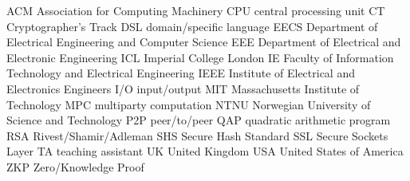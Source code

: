   {ACM}  {Association for Computing Machinery}
  {CPU}  {central processing unit}
   {CT}   {Cryptographer's Track}
  {DSL}  {domain\-/specific language}
 {EECS} {Department of Electrical Engineering and Computer Science}
  {EEE}  {Department of Electrical and Electronic Engineering}
  {ICL}  {Imperial College London}
   {IE}   {Faculty of Information Technology and Electrical Engineering}
 {IEEE} {Institute of Electrical and Electronics Engineers}
   {I/O}  {input/output}
  {MIT}  {Massachusetts Institute of Technology}
  {MPC}  {multiparty computation}
 {NTNU} {Norwegian University of Science and Technology}
  {P2P}  {peer\-/to\-/peer}
  {QAP}  {quadratic arithmetic program}
  {RSA}  {Rivest\-/Shamir\-/Adleman}
  {SHS}  {Secure Hash Standard}
  {SSL}  {Secure Sockets Layer}
   {TA}   {teaching assistant}
   {UK}   {United Kingdom}
  {USA}  {United States of America}
  {ZKP}  {Zero\-/Knowledge Proof}

\endinput
